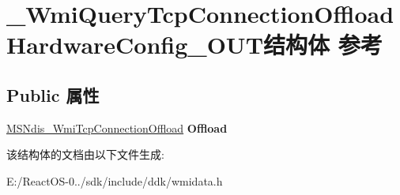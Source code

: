 \hypertarget{struct___wmi_query_tcp_connection_offload_hardware_config___o_u_t}{}\section{\+\_\+\+Wmi\+Query\+Tcp\+Connection\+Offload\+Hardware\+Config\+\_\+\+O\+U\+T结构体 参考}
\label{struct___wmi_query_tcp_connection_offload_hardware_config___o_u_t}
\subsection*{Public 属性}
\begin{DoxyCompactItemize}
\item 
\mbox{\label{struct___wmi_query_tcp_connection_offload_hardware_config___o_u_t_ab7603d421b1afd5b087a03378632dc5a}} 
\hyperlink{struct___m_s_ndis___wmi_tcp_connection_offload}{M\+S\+Ndis\+\_\+\+Wmi\+Tcp\+Connection\+Offload} {\bfseries Offload}
\end{DoxyCompactItemize}


该结构体的文档由以下文件生成\+:\begin{DoxyCompactItemize}
\item 
E\+:/\+React\+O\+S-\/0../sdk/include/ddk/wmidata.\+h\end{DoxyCompactItemize}
